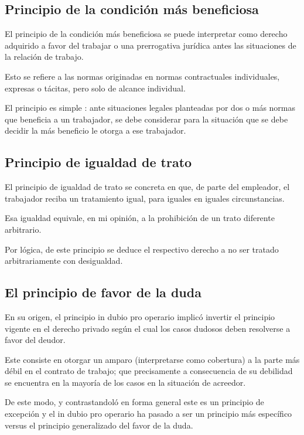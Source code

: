 \documentclass[a4paper]{article}
\begin{document}
\subsection{Principio de la condición más beneficiosa}

El principio de la condición más beneficiosa se puede interpretar como derecho adquirido a favor del trabajar o una prerrogativa jurídica antes las situaciones de la relación de trabajo. 

Esto se refiere a las normas originadas en normas contractuales individuales, expresas o tácitas, pero solo de alcance individual. 

El principio es simple : ante situaciones legales planteadas  por dos o más normas que beneficia a un trabajador, se debe considerar para la situación que se debe decidir la más beneficio le otorga a ese trabajador. 

\subsection{Principio de igualdad de trato}

El principio de igualdad de trato se concreta en que, de parte del empleador, el trabajador reciba un tratamiento igual, para iguales en iguales circunstancias. 

Esa igualdad equivale, en mi opinión, a la prohibición de un trato diferente arbitrario. 

Por lógica, de este principio se deduce el respectivo derecho a no ser tratado arbitrariamente con desigualdad. 

\subsection{El principio de favor de la duda}

En su origen, el principio in dubio pro operario implicó invertir el principio vigente en el derecho privado según el cual los casos dudosos deben resolverse a favor del deudor. 

Este consiste en otorgar un amparo (interpretarse como cobertura) a la parte más débil en el contrato de trabajo;  que precisamente a consecuencia de su debilidad se encuentra en la mayoría de los casos en la situación de acreedor.\cite{Luco2014}

De este modo, y contrastandoló en forma general este es un principio de excepción y el in dubio pro operario ha pasado a ser un principio más específico versus el principio generalizado del favor de la duda. 
\end{document}
